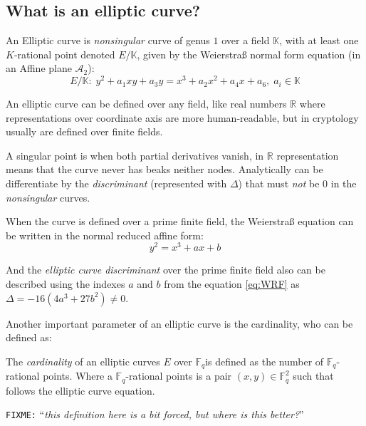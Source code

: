 \documentclass[10pt,a4paper,twoside]{llncs}
\newcommand{\fixme}[1]{\texttt{\color{red}FIXME:} ``\emph{#1}''}
\newcommand{\A}{\ensuremath{\mathcal{A}_{2}}}%
\newcommand{\Fq}{\ensuremath{\mathbb{F}_q}}%
\begin{document}
\subsection{What is an elliptic curve? \label{sec:ce}}


\begin{definition}\label{def:ce}
An Elliptic curve is \emph{nonsingular} curve of genus $1$ over a field $\mathbb{K}$, with at least one $K$-rational point denoted $E/\mathbb{K}$, given by the Weierstra\ss{} normal form equation (in an Affine plane \A):
\begin{equation}\label{eq:WNF}
E/\mathbb{K}:\; y^{2} + a_{1}xy + a_{3}y = x^{3} + a_{2}x^{2} + a_{4}x + a_{6},\; a_{i} \in \mathbb{K}
\end{equation}
\end{definition}

An elliptic curve can be defined over any field, like real numbers $\mathbb{R}$ where representations over coordinate axis are more human-readable, but in cryptology usually are defined over finite fields.

A singular point is when both partial derivatives vanish, in $\mathbb{R}$ representation means that the curve never has beaks neither nodes. Analytically can be differentiate by the \emph{discriminant} (represented with $\Delta$) that must \emph{not} be 0 in the \emph{nonsingular} curves.

When the curve is defined over a prime finite field, the Weierstra\ss{} equation can be written in the normal reduced affine form:
\begin{equation}\label{eq:WRF}
y^2=x^3+ax+b
\end{equation}

And the \emph{elliptic curve discriminant} over the prime finite field also can be described using the indexes $a$ and $b$ from the equation \ref{eq:WRF} as $\Delta = -16(4a^3+27b^2)\ne 0$.

Another important parameter of an elliptic curve is the cardinality, who can be defined as:
\begin{definition}\label{def:cardinality}
 The \emph{cardinality} of an elliptic curves $E$ over \Fq is defined as the number of \Fq-rational points. Where a \Fq-rational points is a pair $(x,y)\in \mathbb{F}_{q}^{2}$ such that follows the elliptic curve equation.
\end{definition}
\fixme{this definition here is a bit forced, but where is this better?}
\end{document}

